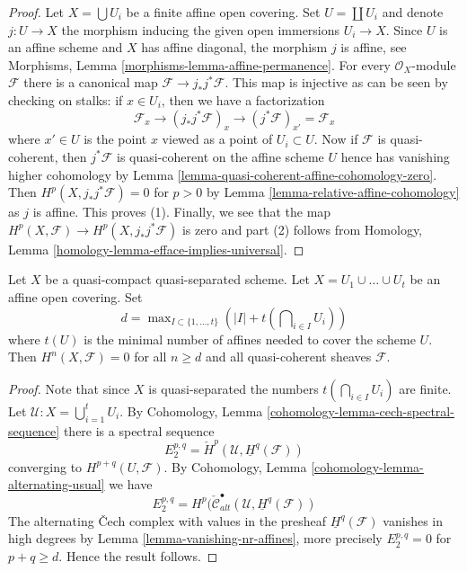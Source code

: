 \begin{proof}
Let $X = \bigcup U_i$ be a finite affine open covering.
Set $U = \coprod U_i$ and denote $j : U \to X$
the morphism inducing the given open immersions $U_i \to X$.
Since $U$ is an affine scheme and $X$ has affine diagonal,
the morphism $j$ is affine, see
Morphisms, Lemma \ref{morphisms-lemma-affine-permanence}.
For every $\mathcal{O}_X$-module $\mathcal{F}$ there is
a canonical map $\mathcal{F} \to j_*j^*\mathcal{F}$.
This map is injective as can be seen by checking on stalks:
if $x \in U_i$, then we have a factorization
$$
\mathcal{F}_x \to (j_*j^*\mathcal{F})_x
\to (j^*\mathcal{F})_{x'} = \mathcal{F}_x
$$
where $x' \in U$ is the point $x$ viewed as a point of $U_i \subset U$.
Now if $\mathcal{F}$ is quasi-coherent, then $j^*\mathcal{F}$
is quasi-coherent on the affine scheme $U$ hence has vanishing
higher cohomology by
Lemma \ref{lemma-quasi-coherent-affine-cohomology-zero}.
Then $H^p(X, j_*j^*\mathcal{F}) = 0$ for
$p > 0$ by Lemma \ref{lemma-relative-affine-cohomology}
as $j$ is affine. This proves (1).
Finally, we see that the map
$H^p(X, \mathcal{F}) \to H^p(X, j_*j^*\mathcal{F})$
is zero and part (2) follows from
Homology, Lemma \ref{homology-lemma-efface-implies-universal}.
\end{proof}

\begin{lemma}
\label{lemma-vanishing-nr-affines-quasi-separated}
Let $X$ be a quasi-compact quasi-separated scheme.
Let $X = U_1 \cup \ldots \cup U_t$ be an affine open covering.
Set
$$
d = \max\nolimits_{I \subset \{1, \ldots, t\}}
\left(|I| + t(\bigcap\nolimits_{i \in I} U_i)\right)
$$
where $t(U)$ is the minimal number of affines needed to cover
the scheme $U$. Then $H^n(X, \mathcal{F}) = 0$ for all $n \geq d$ and all
quasi-coherent sheaves $\mathcal{F}$.
\end{lemma}

\begin{proof}
Note that since $X$ is quasi-separated the numbers
$t(\bigcap_{i \in I} U_i)$ are finite.
Let $\mathcal{U} : X = \bigcup_{i = 1}^t U_i$.
By
Cohomology, Lemma \ref{cohomology-lemma-cech-spectral-sequence}
there is a spectral sequence
$$
E_2^{p, q} = \check{H}^p(\mathcal{U}, \underline{H}^q(\mathcal{F}))
$$
converging to $H^{p + q}(U, \mathcal{F})$. By
Cohomology, Lemma \ref{cohomology-lemma-alternating-usual}
we have
$$
E_2^{p, q} =
H^p(\check{\mathcal{C}}_{alt}^\bullet(
\mathcal{U}, \underline{H}^q(\mathcal{F}))
$$
The alternating {\v C}ech complex with values in the presheaf
$\underline{H}^q(\mathcal{F})$ vanishes in high degrees by
Lemma \ref{lemma-vanishing-nr-affines},
more precisely $E_2^{p, q} = 0$ for $p + q \geq d$.
Hence the result follows.
\end{proof}

